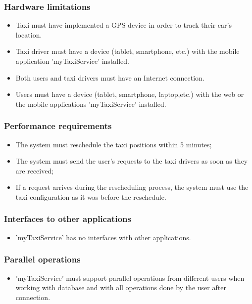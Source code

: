 \documentclass{article}
\begin{document}
	    \subsubsection{Hardware limitations}
    	    \begin{itemize}
    	        \item Taxi must have implemented a GPS device in order to track their car's location.
    	        \item Taxi driver must have a device (tablet, smartphone, etc.) with the mobile application 'myTaxiService' installed.
    	        \item Both users and taxi drivers must have an Internet connection.
    	        \item Users must have a device (tablet, smartphone, laptop,etc.) with the web or the mobile applications 'myTaxiService' installed.
    	    \end{itemize}
    	\subsubsection{Performance requirements}
    	    \begin{itemize}
    	        \item The system must reschedule the taxi positions within 5 minutes;
    	        \item The system must send the user's requests to the taxi drivers as soon as they are received;
    	        \item If a request arrives during the rescheduling process, the system must use the taxi configuration as it was before the reschedule.
    	    \end{itemize}
    	\subsubsection{Interfaces to other applications}
    	    \begin{itemize}
    	        \item 'myTaxiService' has no interfaces with other applications.
    	    \end{itemize}
        \subsubsection{Parallel operations}
            \begin{itemize}
                \item  'myTaxiService' must support parallel operations from different users when working with database and with all operations done by the user after connection.
            \end{itemize}
       
\end{document}
